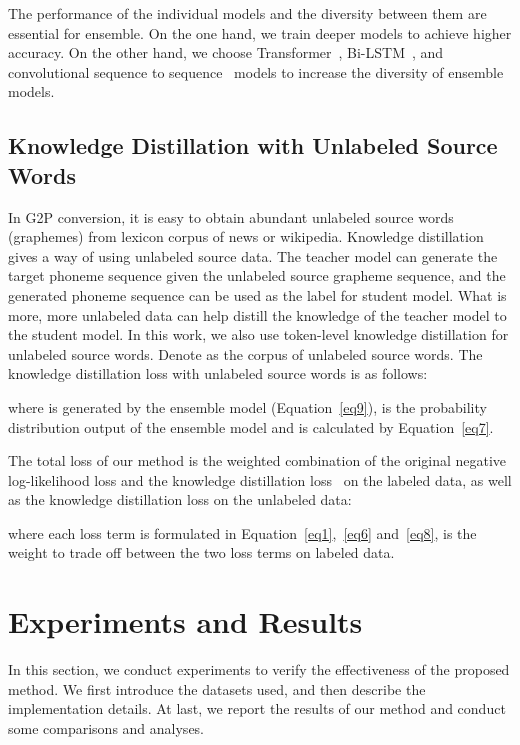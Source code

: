 \documentclass[a4paper]{article}
\begin{document}
The performance of the individual models and the diversity between them are essential for ensemble. On the one hand, we train deeper models to achieve higher accuracy. On the other hand, we choose Transformer~\cite{vaswani2017attention}, Bi-LSTM~\cite{wu2016google}, and convolutional sequence to sequence~\cite{gehring2017convolutional} models to increase the diversity of ensemble models.


\subsection{Knowledge Distillation with Unlabeled Source Words}
In G2P conversion, it is easy to obtain abundant unlabeled source words (graphemes) from lexicon corpus of news or wikipedia. Knowledge distillation gives a way of using unlabeled source data. The teacher model can generate the target phoneme sequence given the unlabeled source grapheme sequence, and the generated phoneme sequence can be used as the label for student model. What is more, more unlabeled data can help distill the knowledge of the teacher model to the student model. In this work, we also use token-level knowledge distillation for unlabeled source words. Denote  as the corpus of unlabeled source words. The knowledge distillation loss with unlabeled source words is as follows:


where  is generated by the ensemble model (Equation~\ref{eq9}),  is the probability distribution output of the ensemble model and is calculated by Equation~\ref{eq7}. 


The total loss of our method is the weighted combination of the original negative log-likelihood loss and the knowledge distillation loss~\cite{kim2016sequence,tan2018multilingual} on the labeled data, as well as the knowledge distillation loss on the unlabeled data:

where each loss term is formulated in Equation~\ref{eq1},~\ref{eq6} and~\ref{eq8},  is the weight to trade off between the two loss terms on labeled data.



\section{Experiments and Results}
In this section, we conduct experiments to verify the effectiveness of the proposed method. We first introduce the datasets used, and then describe the implementation details. At last, we report the results of our method and conduct some comparisons and analyses. 
\end{document}
